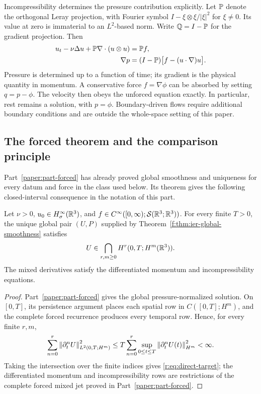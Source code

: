 Incompressibility determines the pressure contribution explicitly.
Let \(\mathbb P\) denote the orthogonal Leray projection, with Fourier symbol
\(I-\xi\otimes\xi/|\xi|^2\) for \(\xi\ne0\). Its value at zero
is immaterial to an \(L^2\)-based norm. Write \(\mathbb Q=I-\mathbb P\) for
the gradient projection. Then
\begin{equation}
 \begin{aligned}
 u_t-\nu\Delta u+\mathbb P\nabla\cdot(u\otimes u)&=\mathbb P f,\\
 \nabla p&=(I-\mathbb P)\bigl[f-(u\cdot\nabla)u\bigr].
 \end{aligned}
 \label{r:eq:projected}
\end{equation}
Pressure is determined up to a function of time; its gradient is the
physical quantity in momentum. A conservative force \(f=\nabla\phi\)
can be absorbed by setting \(q=p-\phi\). The velocity then obeys the
unforced equation exactly. In particular, rest remains a solution, with
\(p=\phi\). Boundary-driven flows require additional boundary conditions and are
outside the whole-space setting of this paper.


\subsection{The forced theorem and the comparison principle}

Part~\ref{paper:part-forced} has already proved global smoothness and uniqueness for every datum
and force in the class used below. Its theorem gives the following
closed-interval consequence in the notation of this part.

\begin{corollary}
\label{r:thm:supplied-forced}
Let \(\nu>0\), \(u_0\in H^\infty_\sigma(\mathbb R^3)\), and
\(f\in C^\infty([0,\infty);\mathcal S(\mathbb R^3;\mathbb R^3))\). For every finite
\(T>0\), the unique global pair \((U,P)\) supplied by
Theorem~\ref{f:thm:ier-global-smoothness} satisfies
\begin{equation}
 U\in\bigcap_{r,m\ge0}H^r(0,T;H^m(\mathbb R^3)).
 \label{r:eq:direct-target}
\end{equation}
The mixed derivatives satisfy the differentiated momentum and
incompressibility equations.
\end{corollary}

\begin{proof}
Part~\ref{paper:part-forced} gives the global pressure-normalized solution. On \([0,T]\), its
persistence argument places each spatial row in \(C([0,T];H^m)\), and the
complete forced recurrence produces every temporal row. Hence, for every
finite \(r,m\),
\[
 \sum_{n=0}^{r}\left\lVert \partial_t^nU\right\rVert_{L^2(0,T;H^m)}^2
 \le T\sum_{n=0}^{r}
 \sup_{0\le t\le T}\left\lVert \partial_t^nU(t)\right\rVert_{H^m}^2<\infty.
\]
Taking the intersection over the finite indices gives
\eqref{r:eq:direct-target}; the differentiated momentum and incompressibility
rows are restrictions of the complete forced mixed jet proved in Part~\ref{paper:part-forced}.
\end{proof}

